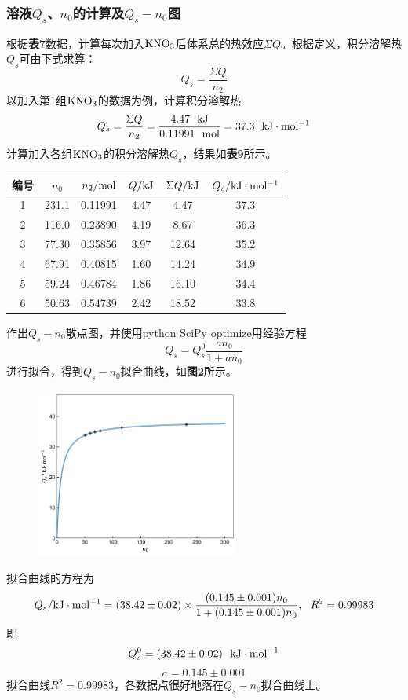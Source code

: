 \documentclass[12pt]{article}
\begin{document}
\subsubsection{溶液$Q_{s}$、$n_{0}$的计算及$Q_{s}-n_{0}$图}
根据\textbf{表7}数据，计算每次加入$\rm KNO_{3}$后体系总的热效应$\Sigma Q$。根据定义，积分溶解热$Q_{s}$可由下式求算：
$$
Q_{s}=\frac{\Sigma Q}{n_{2}}
$$
以加入第1组$\rm KNO_{3}$的数据为例，计算积分溶解热
$$
Q_{s}=\frac{\Sigma Q}{n_{2}}=\frac{4.47\ \ {\rm kJ}}{0.11991\ \ {\rm mol}}=37.3\ \ {\rm kJ\cdot mol^{-1}}
$$
计算加入各组$\rm KNO_{3}$的积分溶解热$Q_{s}$，结果如\textbf{表9}所示。
\begin{table}[h]
	\centering
	\begin{tabular}{cccccc}
		\toprule
		编号 & $n_{0}$ &  $n_{2}/{\rm mol}$ & $Q/{\rm kJ}$ & $ \Sigma Q/{\rm kJ}$ & $Q_{s}/{\rm kJ\cdot mol^{-1}}$ \\
		\midrule
		1 & 231.1 & 0.11991 & 4.47 & 4.47  & 37.3 \\
		2 & 116.0 & 0.23890 & 4.19 & 8.67  & 36.3 \\
		3 & 77.30 & 0.35856 & 3.97 & 12.64 & 35.2 \\
		4 & 67.91 & 0.40815 & 1.60 & 14.24 & 34.9 \\
		5 & 59.24 & 0.46784 & 1.86 & 16.10 & 34.4 \\
		6 & 50.63 & 0.54739 & 2.42 & 18.52 & 33.8 \\
		\bottomrule
	\end{tabular}
\end{table}
\par
作出$Q_{s}-n_{0}$散点图，并使用python SciPy optimize用经验方程
$$
Q_{s}=Q^{0}_{s}\frac{an_{0}}{1+an_{0}}
$$
进行拟合，得到$Q_{s}-n_{0}$拟合曲线，如\textbf{图2}所示。

\begin{figure}[h]
	\centering
	\includegraphics[width=0.60\textwidth]{2.jpg}
\end{figure}
\par
拟合曲线的方程为
$$
Q_{s}/{\rm kJ\cdot mol^{-1}} = (38.42\pm 0.02)\times \frac{(0.145\pm 0.001)n_{0}}{1+(0.145\pm 0.001)n_{0}},\  \ R^{2}=0.99983
$$
即
$$
Q^{0}_{s}=(38.42\pm 0.02)\ \ {\rm kJ\cdot mol^{-1}}
$$
$$
a=0.145\pm 0.001
$$
拟合曲线$R^{2}=0.99983$，各数据点很好地落在$Q_{s}-n_{0}$拟合曲线上。
\end{document}
